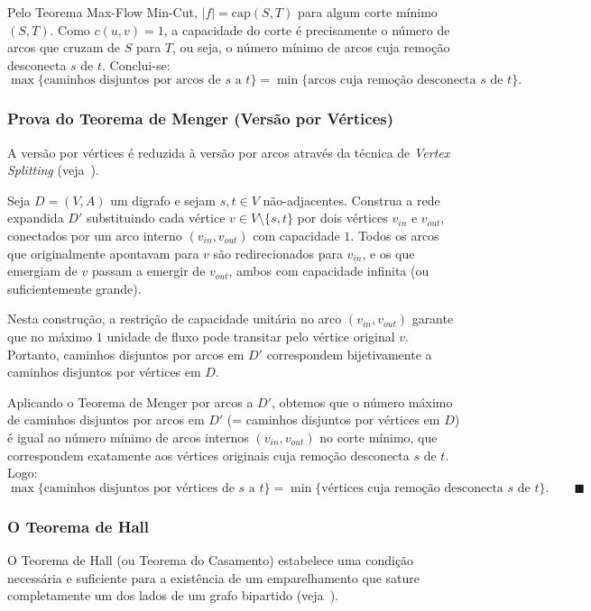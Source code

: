 \documentclass[12pt,a4paper]{article}
\begin{document}
Pelo Teorema Max-Flow Min-Cut, $|f| = \text{cap}(S,T)$ para algum corte mínimo $(S,T)$. Como $c(u,v) = 1$, a capacidade do corte é precisamente o número de arcos que cruzam de $S$ para $T$, ou seja, o número mínimo de arcos cuja remoção desconecta $s$ de $t$. Conclui-se:
$$\max\{\text{caminhos disjuntos por arcos de } s \text{ a } t\} = \min\{\text{arcos cuja remoção desconecta } s \text{ de } t\}.$$

\subsubsection{Prova do Teorema de Menger (Versão por Vértices)}

A versão por vértices é reduzida à versão por arcos através da técnica de \textit{Vertex Splitting} (veja~\cite{korte2018combinatorial}).

Seja $D = (V, A)$ um digrafo e sejam $s, t \in V$ não-adjacentes. Construa a rede expandida $D'$ substituindo cada vértice $v \in V \setminus \{s, t\}$ por dois vértices $v_{in}$ e $v_{out}$, conectados por um arco interno $(v_{in}, v_{out})$ com capacidade $1$. Todos os arcos que originalmente apontavam para $v$ são redirecionados para $v_{in}$, e os que emergiam de $v$ passam a emergir de $v_{out}$, ambos com capacidade infinita (ou suficientemente grande).

Nesta construção, a restrição de capacidade unitária no arco $(v_{in}, v_{out})$ garante que no máximo $1$ unidade de fluxo pode transitar pelo vértice original $v$. Portanto, caminhos disjuntos por arcos em $D'$ correspondem bijetivamente a caminhos disjuntos por vértices em $D$.

Aplicando o Teorema de Menger por arcos a $D'$, obtemos que o número máximo de caminhos disjuntos por arcos em $D'$ (= caminhos disjuntos por vértices em $D$) é igual ao número mínimo de arcos internos $(v_{in}, v_{out})$ no corte mínimo, que correspondem exatamente aos vértices originais cuja remoção desconecta $s$ de $t$. Logo:
$$\max\{\text{caminhos disjuntos por vértices de } s \text{ a } t\} = \min\{\text{vértices cuja remoção desconecta } s \text{ de } t\}. \qquad \blacksquare$$

\subsubsection{O Teorema de Hall}

O Teorema de Hall (ou Teorema do Casamento) estabelece uma condição necessária e suficiente para a existência de um emparelhamento que sature completamente um dos lados de um grafo bipartido (veja~\cite{bondy2008graph, diestel2017graph}).
\end{document}
